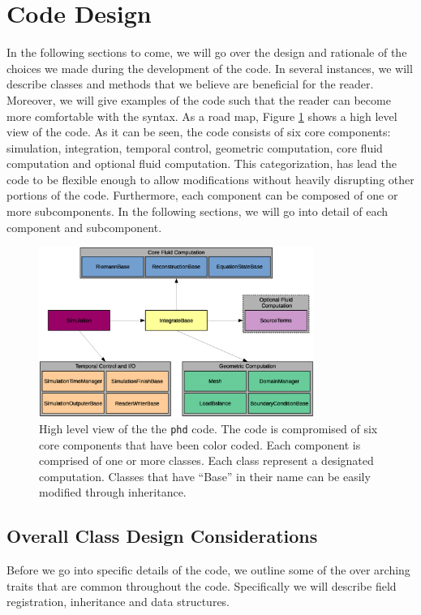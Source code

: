 \section{Code Design}
In the following sections to come, we will go over the design and rationale of the choices
we made during the development of the code. In several instances, we will describe 
classes and methods that we believe are beneficial for the reader. Moreover, we will
give examples of the code such that the reader can become more
comfortable with the syntax. As a road map, Figure \ref{fig.phd_design} shows a high level view of the code. As it can be seen, the code consists of six core components:
simulation, integration, temporal control, geometric computation, core fluid
computation and optional fluid computation. This categorization, has lead the code
to be flexible enough to allow modifications without heavily disrupting other
portions of the code. Furthermore, each component can be composed of one or more
subcomponents. In the following sections, we will go into detail of each component and subcomponent.
\begin{figure}
    \begin{center}
        \includegraphics[width=0.8\textwidth]{figures/phd_chart.eps}
        \caption{High level view of the the \texttt{phd} code. The code is compromised of six core components
        that have been color coded. Each component is comprised of one or more classes. Each class
        represent a designated computation. Classes that have ``Base'' in their
        name can be easily modified through inheritance.}
        \label{fig.phd_design}
    \end{center}
\end{figure}

\subsection{Overall Class Design Considerations}
Before we go into specific details of the code, we outline some of the over arching
traits that are common throughout the code. Specifically we will describe field registration,
inheritance and data structures.

